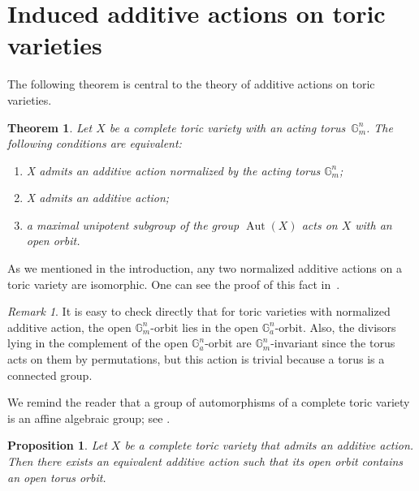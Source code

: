 \documentclass[a4paper,draft,reqno,12pt]{amsart}
\newtheorem{proposition}{Proposition}
\newtheorem{theorem}{Theorem}
\theoremstyle{definition}
\theoremstyle{definition}
\theoremstyle{remark}
\newtheorem {remark}{Remark}
\DeclareMathOperator{\Aut}{Aut}
\def\BG{{\mathbb G}}
\def\BG{{\mathbb G}}
\begin{document}
\section{Induced additive actions on toric varieties}

The following theorem is central to the theory of additive actions on toric varieties.

\begin{theorem}\cite[Theorem 3]{AR}\label{normandany}
    Let $X$ be a complete toric variety with an acting torus~$\BG_m^n$. The following conditions are equivalent:\begin{enumerate}
        \item[1)] X admits an additive action normalized by the acting torus $\BG_m^n$;
        \item[2)] X admits an additive action;
        \item[3)] a maximal unipotent subgroup of the group $\Aut(X)$ acts on $X$ with an open orbit.
    \end{enumerate}
\end{theorem}

As we mentioned in the introduction, any two normalized additive actions on a toric variety are isomorphic. One can see the proof of this fact in~\cite[Theorem 2]{AR}.

\begin{remark}\label{normaction}
    It is easy to check directly that for toric varieties with normalized additive action, the open $\BG_m^n$-orbit lies in the open $\BG_a^n$-orbit. Also, the divisors lying in the complement of the open $\BG_a^n$-orbit are $\BG_m^n$-invariant since the torus acts on them by permutations, but this action is trivial because a torus is a connected group.
\end{remark}

We remind the reader that a group of automorphisms of a complete toric variety is an affine algebraic group; see \cite{DM}.

\begin{proposition}\label{openorbit}
    Let $X$ be a complete toric variety that admits an additive action. Then there exists an equivalent additive action such that its open orbit contains an open torus orbit.
\end{proposition}
\end{document}
